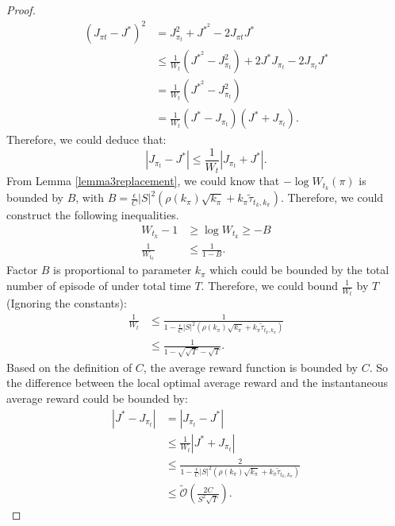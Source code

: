 \begin{lemma}
\begin{proof}
\begin{equation}
\begin{aligned}
\left(J_{\pi t}-J^{*}\right)^{2} &=J_{\pi_{t}}^{2}+J^{*^{2}}-2 J_{\pi t} J^{*} \\
& \leq \frac{1}{W_{t}}\left(J^{*^{2}}-J_{\pi_{t}}^{2}\right)+2 J^{*} J_{\pi_{t}}-2 J_{\pi_{t}} J^{*} \\
&=\frac{1}{W_{t}}\left(J^{*^{2}}-J_{\pi_{t}}^{2}\right) \\
&=\frac{1}{W_{t}}\left(J^{*}-J_{\pi_{t}}\right)\left(J^{*}+J_{\pi_{t}}\right).
\end{aligned}
\end{equation}
Therefore, we could deduce that:
\begin{equation}
|J_{\pi_{t}}-J^{*}| \leq \frac{1}{W_{t}}|J_{\pi_{t}}+J^{*}|.
\end{equation}
From Lemma \ref{lemma3replacement}, we could know that $-\log W_{t_{k}}(\pi)$ is bounded by $B$, with $B = \frac{\epsilon}{C}|S|^{2}(\rho(k_{\pi}) \sqrt{k_{\pi}} + k_{\pi} \tilde{\tau}_{t_{k},k_{\pi}})$. Therefore, we could construct the following inequalities.
\begin{equation}
\begin{aligned}
W_{t_{k}}-1 &\geq \log W_{t_{k}} \geq -B\\
\frac{1}{W_{t_{k}}} &\leq \frac{1}{1-B}.
\end{aligned}
\end{equation}
Factor $B$ is proportional to parameter $k_{\pi}$ which could be bounded by the total number of episode of under total time $T$. Therefore, we could bound $\frac{1}{W_{t}}$ by $T$(Ignoring the constants):
\begin{equation}
\begin{aligned}
\frac{1}{W_{t}} &\leq \frac{1}{1-\frac{\epsilon}{C}|S|^{2}(\rho(k_{\pi}) \sqrt{k_{\pi}} + k_{\pi} \tilde{\tau}_{t_{k},k_{\pi}})}\\
&\leq \frac{1}{1-\sqrt{\sqrt{T}}-\sqrt{T}}.
\end{aligned}
\end{equation}
Based on the definition of $C$, the average reward function is bounded by $C$. So the difference between the local optimal average reward and the instantaneous average reward could be bounded by:
\begin{equation}
\begin{aligned}
|J^{*} - J_{\pi_{t}}| &= |J_{\pi_{t}}-J^{*}|\\
&\leq \frac{1}{W_{t}}|J^{*}+J_{\pi_{t}}|\\
&\leq \frac{2}{1-\frac{\epsilon}{C}|S|^{2}(\rho(k_{\pi}) \sqrt{k_{\pi}} + k_{\pi} \tilde{\tau}_{t_{k},k_{\pi}})}\\
&\leq \tilde{\mathcal{O}} (\frac{2C}{S^{2}\sqrt{T}}).
\end{aligned}
\end{equation}
\end{proof}
\end{lemma}

